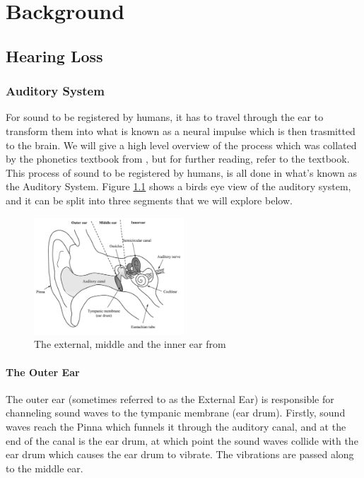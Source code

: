 \documentclass[logo,bsc,singlespacing,parskip,online]{infthesis}
\begin{document}
\chapter{Background}
\label{ch:background}

\section{Hearing Loss}
\subsection{Auditory System}
For sound to be registered by humans, it has to travel through the ear to transform them into
what is known as a neural impulse which is then trasmitted to the brain. We will 
give a high level overview of the process which was collated by the phonetics textbook from \citet{Wayland2018Phonetics},
 but for further reading, refer to the textbook. 
 This process of sound to be registered by humans, is all done in what's known as the Auditory System.
 Figure \ref{fig:ear} shows a birds eye view of the auditory system, and it can be split into three segments
 that we will explore below.

\begin{figure}[h]
   \centering
   \includegraphics[width=0.5\textwidth]{wayland-ear}
   \caption{The external, middle and the inner ear from \citet{Wayland2018Phonetics}}
   \label{fig:ear}
\end{figure}

\subsubsection{The Outer Ear}
The outer ear (sometimes referred to as the External Ear) is responsible for channeling sound waves to the tympanic membrane (ear drum). Firstly,
sound waves reach the Pinna which funnels it through the auditory canal, and at the end of the canal 
is the ear drum, at which point the sound waves collide with the ear drum which causes the ear drum to vibrate. 
The vibrations are passed along to the middle ear.
\end{document}
